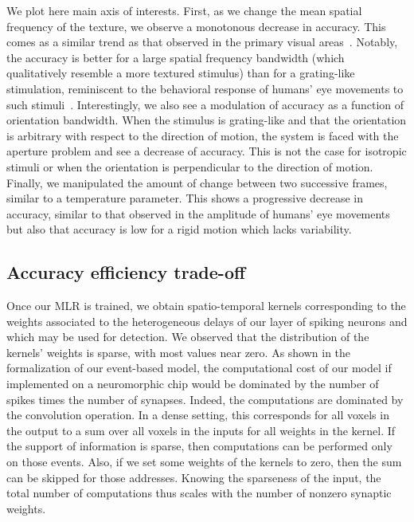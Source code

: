 \documentclass[default]{sn-jnl}%
\theoremstyle{thmstyleone}%
\theoremstyle{thmstyletwo}%
\theoremstyle{thmstylethree}%
\newcommand{\note}[1]{{\sethlcolor{yellow}\hl{#1}}}
\begin{document}
We plot here main axis of interests. First, as we change the mean spatial frequency of the texture, we observe a monotonous decrease in accuracy. This comes as a similar trend as that observed in the primary visual areas~\citep{priebe_tuning_2006}. %
Notably, the accuracy is better for a large spatial frequency bandwidth (which qualitatively resemble a more textured stimulus) than for a grating-like stimulation, reminiscent to the behavioral response of humans' eye movements to such stimuli~\citep{simoncini_more_2012}. Interestingly, we also see a modulation of accuracy as a function of orientation bandwidth. When the stimulus is grating-like and that the orientation is arbitrary with respect to the direction of motion, the system is faced with the aperture problem and see a decrease of accuracy. This is not the case for isotropic stimuli or when the orientation is perpendicular to the direction of motion. Finally, we manipulated the amount of change between two successive frames, similar to a temperature parameter. This shows a progressive decrease in accuracy, similar to that observed in the amplitude of humans' eye movements~\citep{mansour_pour_speed_2018} but also that accuracy is low for a rigid motion which lacks variability.
%
\subsection{Accuracy efficiency trade-off}%

Once our MLR is trained, we obtain spatio-temporal kernels corresponding to the weights associated to the heterogeneous delays of our layer of spiking neurons and which may be used for detection. We observed that the distribution of the kernels' weights is sparse, with most values near zero. As shown in the formalization of our event-based model, the computational cost of our model if implemented on a neuromorphic chip would be dominated by the number of spikes times the number of synapses. Indeed, the computations are dominated by the convolution operation. In a dense setting, this corresponds for all voxels in the output to a sum over all voxels in the inputs for all weights in the kernel. If the support of information is sparse, then computations can be performed only on those events. Also, if we set some weights of the kernels to zero, then the sum can be skipped for those addresses. Knowing the sparseness of the input, the total number of computations thus scales with the number of nonzero synaptic weights. 
\end{document}
